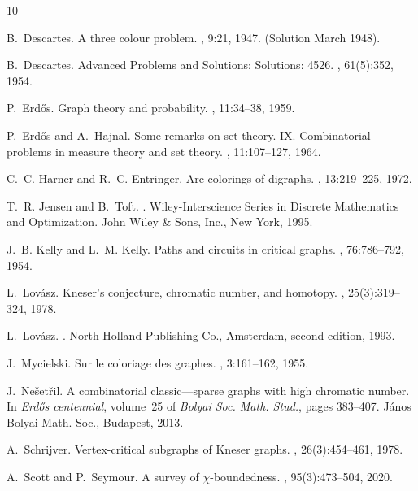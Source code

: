 \documentclass{article}
\begin{document}

\begin{thebibliography}{10}

B.~Descartes.
\newblock A three colour problem.
, 9:21, 1947.
\newblock (Solution March 1948).

B.~Descartes.
\newblock Advanced {P}roblems and {S}olutions: {S}olutions: 4526.
, 61(5):352, 1954.

P.~Erd{\H{o}}s.
\newblock Graph theory and probability.
, 11:34--38, 1959.

P.~Erd{\H{o}}s and A.~Hajnal.
\newblock Some remarks on set theory. {IX}. {C}ombinatorial problems in measure
  theory and set theory.
, 11:107--127, 1964.

C.~C. Harner and R.~C. Entringer.
\newblock Arc colorings of digraphs.
, 13:219--225, 1972.

T.~R. Jensen and B.~Toft.
.
\newblock Wiley-Interscience Series in Discrete Mathematics and Optimization.
  John Wiley \& Sons, Inc., New York, 1995.

J.~B. Kelly and L.~M. Kelly.
\newblock Paths and circuits in critical graphs.
, 76:786--792, 1954.

L.~Lov{\'a}sz.
\newblock Kneser's conjecture, chromatic number, and homotopy.
, 25(3):319--324, 1978.

L.~Lov\'asz.
.
\newblock North-Holland Publishing Co., Amsterdam, second edition, 1993.

J.~Mycielski.
\newblock Sur le coloriage des graphes.
, 3:161--162, 1955.

J.~Ne{\v{s}}et{\v{r}}il.
\newblock A combinatorial classic---sparse graphs with high chromatic number.
\newblock In {\em Erd{\H{o}}s centennial}, volume~25 of {\em Bolyai Soc. Math.
  Stud.}, pages 383--407. János Bolyai Math. Soc., Budapest, 2013.

A.~Schrijver.
\newblock Vertex-critical subgraphs of {K}neser graphs.
, 26(3):454--461, 1978.

A.~Scott and P.~Seymour.
\newblock A survey of {$\chi$}-boundedness.
, 95(3):473--504, 2020.


\end{thebibliography}
\end{document}
